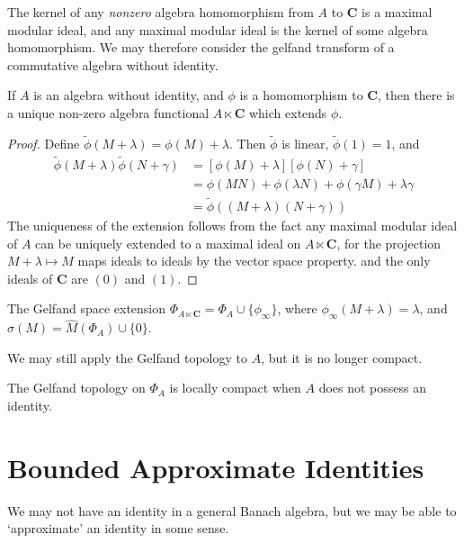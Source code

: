 The kernel of any {\it nonzero} algebra homomorphism from $A$ to $\mathbf{C}$ is a maximal modular ideal, and any maximal modular ideal is the kernel of some algebra homomorphism.  We may therefore consider the gelfand transform of a commutative algebra without identity.

\begin{lemma}
    If $A$ is an algebra without identity, and $\phi$ is a homomorphism to $\mathbf{C}$, then there is a unique non-zero algebra functional $A \ltimes \mathbf{C}$ which extends $\phi$.
\end{lemma}
\begin{proof}
    Define $\tilde{\phi}(M + \lambda) = \phi(M) + \lambda$. Then $\tilde{\phi}$ is linear, $\tilde{\phi}(1) = 1$, and
    \begin{align*}
        \tilde{\phi}(M + \lambda) \tilde{\phi}(N + \gamma) &= [\phi(M) + \lambda][\phi(N) + \gamma]\\
        &= \phi(MN) + \phi(\lambda N) + \phi(\gamma M) + \lambda \gamma\\
        &= \tilde{\phi}((M + \lambda)(N + \gamma))
    \end{align*}
    The uniqueness of the extension follows from the fact any maximal modular ideal of $A$ can be uniquely extended to a maximal ideal on $A \ltimes \mathbf{C}$, for the projection $M + \lambda \mapsto M$ maps ideals to ideals by the vector space property. and the only ideals of $\mathbf{C}$ are $(0)$ and $(1)$.
\end{proof}

\begin{corollary}
    The Gelfand space extension $\Phi_{A \ltimes \mathbf{C}} = \Phi_A \cup \{ \phi_\infty \}$, where $\phi_\infty(M + \lambda) = \lambda$, and $\sigma(M) = \widehat{M}(\Phi_{A}) \cup \{ 0 \}$.
\end{corollary}

We may still apply the Gelfand topology to $A$, but it is no longer compact.

\begin{theorem}
    The Gelfand topology on $\Phi_A$ is locally compact when $A$ does not possess an identity.
\end{theorem}

\section{Bounded Approximate Identities}

We may not have an identity in a general Banach algebra, but we may be able to `approximate' an identity in some sense.

